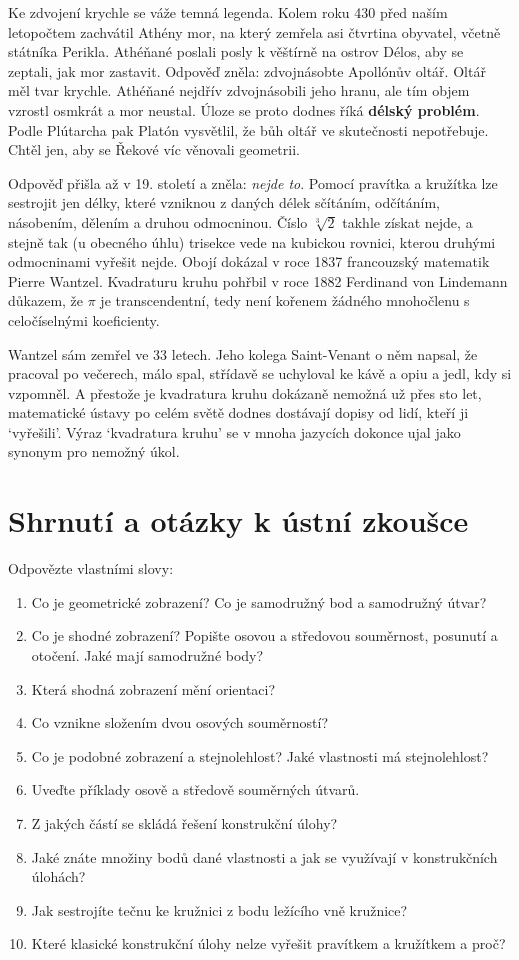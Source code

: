 Ke zdvojení krychle se váže temná legenda. Kolem roku 430 před naším letopočtem zachvátil Athény mor, na který zemřela asi čtvrtina obyvatel, včetně státníka Perikla. Athéňané poslali posly k věštírně na ostrov Délos, aby se zeptali, jak mor zastavit. Odpověď zněla: zdvojnásobte Apollónův oltář. Oltář měl tvar krychle. Athéňané nejdřív zdvojnásobili jeho hranu, ale tím objem vzrostl osmkrát a mor neustal. Úloze se proto dodnes říká \textbf{délský problém}. Podle Plútarcha pak Platón vysvětlil, že bůh oltář ve skutečnosti nepotřebuje. Chtěl jen, aby se Řekové víc věnovali geometrii.

Odpověď přišla až v 19. století a zněla: \textit{nejde to}. Pomocí pravítka a kružítka lze sestrojit jen délky, které vzniknou z daných délek sčítáním, odčítáním, násobením, dělením a druhou odmocninou. Číslo $\sqrt[3]{2}$ takhle získat nejde, a stejně tak (u obecného úhlu) trisekce vede na kubickou rovnici, kterou druhými odmocninami vyřešit nejde. Obojí dokázal v roce 1837 francouzský matematik Pierre Wantzel. Kvadraturu kruhu pohřbil v roce 1882 Ferdinand von Lindemann důkazem, že $\pi$ je transcendentní, tedy není kořenem žádného mnohočlenu s celočíselnými koeficienty.

Wantzel sám zemřel ve 33 letech. Jeho kolega Saint-Venant o něm napsal, že pracoval po večerech, málo spal, střídavě se uchyloval ke kávě a opiu a jedl, kdy si vzpomněl. A přestože je kvadratura kruhu dokázaně nemožná už přes sto let, matematické ústavy po celém světě dodnes dostávají dopisy od lidí, kteří ji `vyřešili'. Výraz `kvadratura kruhu' se v mnoha jazycích dokonce ujal jako synonym pro nemožný úkol.

\section{Shrnutí a otázky k ústní zkoušce}

\begin{problem}
  Odpovězte vlastními slovy:
  \begin{enumerate}
    \item Co je geometrické zobrazení? Co je samodružný bod a samodružný útvar?
    \item Co je shodné zobrazení? Popište osovou a středovou souměrnost, posunutí a otočení. Jaké mají samodružné body?
    \item Která shodná zobrazení mění orientaci?
    \item Co vznikne složením dvou osových souměrností?
    \item Co je podobné zobrazení a stejnolehlost? Jaké vlastnosti má stejnolehlost?
    \item Uveďte příklady osově a středově souměrných útvarů.
    \item Z jakých částí se skládá řešení konstrukční úlohy?
    \item Jaké znáte množiny bodů dané vlastnosti a jak se využívají v konstrukčních úlohách?
    \item Jak sestrojíte tečnu ke kružnici z bodu ležícího vně kružnice?
    \item Které klasické konstrukční úlohy nelze vyřešit pravítkem a kružítkem a proč?
  \end{enumerate}
\end{problem}
